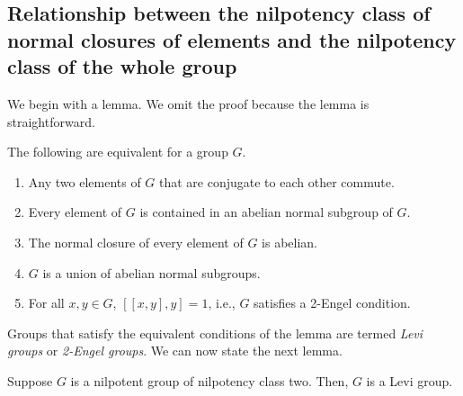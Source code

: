 \documentclass{ucetd}
\begin{document}


\subsection{Relationship between the nilpotency class of normal closures of elements and the nilpotency class of the whole group}

We begin with a lemma. We omit the proof because the lemma is
straightforward.

\begin{lemma}
  The following are equivalent for a group $G$.

  \begin{enumerate}
  \item Any two elements of $G$ that are conjugate to each other
    commute.
  \item Every element of $G$ is contained in an abelian normal
    subgroup of $G$.
  \item The normal closure of every element of $G$ is abelian.
  \item $G$ is a union of abelian normal subgroups.
  \item For all $x,y \in G$, $[[x,y],y] = 1$, i.e., $G$ satisfies a
    2-Engel condition.
  \end{enumerate}
\end{lemma}

Groups that satisfy the equivalent conditions of the lemma are termed
{\em Levi groups} or {\em 2-Engel groups}. We can now state the next
lemma.

\begin{lemma}
  Suppose $G$ is a nilpotent group of nilpotency class two. Then, $G$
  is a Levi group.
\end{lemma}
\end{document}

